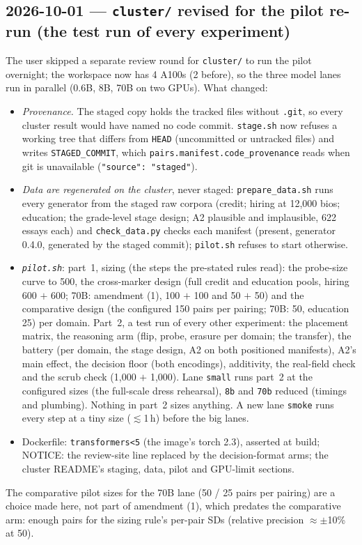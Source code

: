 \documentclass{article}
\begin{document}
\subsection*{2026-10-01 --- \texttt{cluster/} revised for the pilot re-run (the test run of every experiment)}
The user skipped a separate review round for \texttt{cluster/} to run the pilot overnight; the workspace now has
4 A100s (2 before), so the three model lanes run in parallel (0.6B, 8B, 70B on two GPUs). What changed:
\begin{itemize}
  \item \emph{Provenance.} The staged copy holds the tracked files without \texttt{.git}, so every cluster result
        would have named no code commit. \texttt{stage.sh} now refuses a working tree that differs from
        \texttt{HEAD} (uncommitted or untracked files) and writes \texttt{STAGED\_COMMIT}, which
        \texttt{pairs.manifest.code\_provenance} reads when git is unavailable (\texttt{"source": "staged"}).
  \item \emph{Data are regenerated on the cluster}, never staged: \texttt{prepare\_data.sh} runs every generator from
        the staged raw corpora (credit; hiring at 12{,}000 bios; education; the grade-level stage design; A2
        plausible and implausible, 622 essays each) and \texttt{check\_data.py} checks each manifest (present, generator
        0.4.0, generated by the staged commit); \texttt{pilot.sh} refuses to start otherwise.
  \item \emph{\texttt{pilot.sh}}: part~1, sizing (the steps the pre-stated rules read): the probe-size curve to 500,
        the cross-marker design (full credit and education pools, hiring 600 $+$ 600; 70B: amendment (1),
        100 $+$ 100 and 50 $+$ 50) and the comparative design (the configured 150 pairs per pairing; 70B: 50, education
        25) per domain. Part~2, a test run of every other experiment: the placement matrix, the reasoning arm (flip,
        probe, erasure per domain; the transfer), the battery (per domain, the stage design, A2 on both positioned
        manifests), A2's main effect, the decision floor (both encodings), additivity, the real-field check and the
        scrub check (1{,}000 $+$ 1{,}000). Lane \texttt{small} runs part~2 at the configured sizes (the full-scale
        dress rehearsal), \texttt{8b} and \texttt{70b} reduced (timings and plumbing). Nothing in part~2 sizes
        anything. A new lane \texttt{smoke} runs every step at a tiny size ($\lesssim$1\,h) before the big lanes.
  \item Dockerfile: \texttt{transformers<5} (the image's torch 2.3), asserted at build; NOTICE: the review-site line
        replaced by the decision-format arms; the cluster README's staging, data, pilot and GPU-limit sections.
\end{itemize}
The comparative pilot sizes for the 70B lane (50 / 25 pairs per pairing) are a choice made here, not part of
amendment (1), which predates the comparative arm: enough pairs for the sizing rule's per-pair SDs
(relative precision $\approx\pm$10\% at 50).
\end{document}
